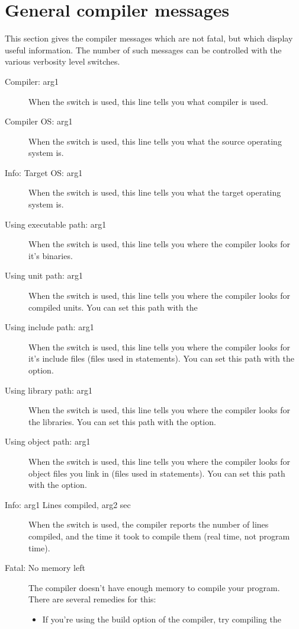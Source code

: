  \section{General compiler messages}
 This section gives the compiler messages which are not fatal, but which
 display useful information. The number of such messages can be
 controlled with the various verbosity level  switches.
 \begin{description}
\item [Compiler: arg1]
 When the  switch is used, this line tells you what compiler
 is used.
\item [Compiler OS: arg1]
 When the  switch is used, this line tells you what the source
 operating system is.
\item [Info: Target OS: arg1]
 When the  switch is used, this line tells you what the target
 operating system is.
\item [Using executable path: arg1]
 When the  switch is used, this line tells you where the compiler
 looks for it's binaries.
\item [Using unit path: arg1]
 When the  switch is used, this line tells you where the compiler
 looks for compiled units. You can set this path with the 
\item [Using include path: arg1]
 When the  switch is used, this line tells you where the compiler
 looks for it's include files (files used in  statements).
 You can set this path with the  option.
\item [Using library path: arg1]
 When the  switch is used, this line tells you where the compiler
 looks for the libraries. You can set this path with the  option.
\item [Using object path: arg1]
 When the  switch is used, this line tells you where the compiler
 looks for object files you link in (files used in  statements).
 You can set this path with the  option.
\item [Info: arg1 Lines compiled, arg2 sec]
 When the  switch is used, the compiler reports the number
 of lines compiled, and the time it took to compile them (real time,
 not program time).
\item [Fatal: No memory left]
 The compiler doesn't have enough memory to compile your program. There are
 several remedies for this:
 \begin{itemize}
 \item If you're using the build option of the compiler, try compiling the

\end{itemize}
\end{description}
